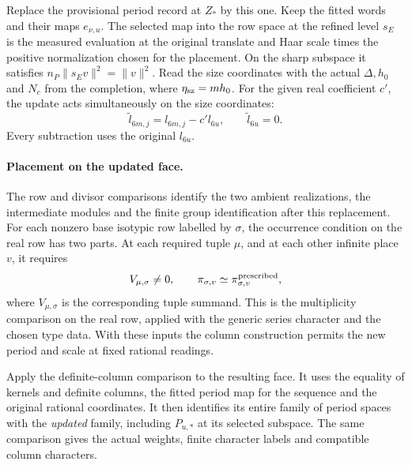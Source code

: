 Replace the provisional period record at \(Z_*\) by this one.
Keep the fitted words and their maps \(e_{\nu,u}\). The selected
map into the row space at the refined level \(s_E\) is the measured evaluation at the
original translate and Haar scale times the positive
normalization chosen for the placement. On the sharp subspace
it satisfies \(n_P\|s_Ev\|^2=\|v\|^2\).
Read the size coordinates with the actual \(\Delta,h_0\) and
\(N_c\) from the completion, where \(\eta_{\rm sz}=mh_0\).
For the given real coefficient \(c'\), the update acts simultaneously
on the size coordinates:
\[
 \widetilde l_{6m,j}=l_{6m,j}-c'l_{6u},\qquad \widetilde l_{6u}=0 .
\]
Every subtraction uses the original \(l_{6u}\).

\paragraph{Placement on the updated face.}
The row and divisor comparisons identify the two ambient realizations,
the intermediate modules and the finite group identification
after this replacement. For each nonzero base isotypic row labelled by \(\sigma\), the occurrence condition on the real row has two parts. At each required tuple \(\mu\), and at each other infinite place \(v\), it requires
\[
 V_{\mu,\sigma}\ne0,\qquad \pi_{\sigma,v}\simeq\pi_{\sigma,v}^{\rm prescribed},
\]
where \(V_{\mu,\sigma}\) is the corresponding tuple summand. This is the multiplicity comparison
on the real row, applied with the generic series character and
the chosen type data. With these inputs the column construction
permits the new period and scale at fixed rational readings.

Apply the definite-column comparison to the resulting face.
It uses the equality of kernels and definite columns, the
fitted period map for the sequence and the original rational coordinates. It then
identifies its entire family of period spaces with the
\emph{updated} family, including \(P_{u,*}\) at its selected
subspace. The same comparison gives the actual weights, finite
character labels and compatible column characters.
\label{cor:automorphic-realization-72}


